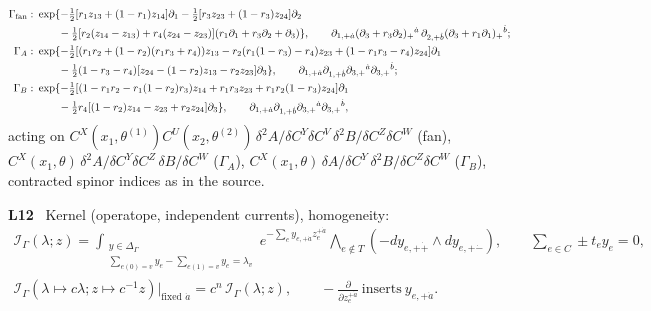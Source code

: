 \documentclass[10pt,a4paper]{article}
\numberwithin{equation}{section}
\newcommand{\cI}{\mathcal I}
\newcommand{\LL}[2]{\textsf{L}(#1){\scriptsize\,\texttt{#2}}}
\newcommand{\LT}[3]{\textsf{L}\,#1\,#2{\scriptsize\,\texttt{#3}}}
\newcommand{\rid}[1]{\par\medskip\noindent\textbf{#1}\ }
\newcommand{\ptr}[2]{\par\nopagebreak{\footnotesize\raggedleft[\,#1\ $\mid$\ #2\,]\par}}
\newcommand{\st}[1]{\textsf{#1}}
\begin{document}
\begin{align*}
\Gamma_{\rm fan}:\ &\exp\{-\tfrac12[r_1z_{13}+(1-r_1)z_{14}]\partial_1-\tfrac12[r_3z_{23}+(1-r_3)z_{24}]\partial_2\\
&\qquad-\tfrac12[r_2(z_{14}-z_{13})+r_4(z_{24}-z_{23})](r_1\partial_1+r_3\partial_2+\partial_3)\},\qquad
\partial_{1,+\dot a}(\partial_3+r_3\partial_2)_+{}^{\dot a}\,\partial_{2,+\dot b}(\partial_3+r_1\partial_1)_+{}^{\dot b};\\
\Gamma_A:\ &\exp\{-\tfrac12[(r_1r_2+(1-r_2)(r_1r_3+r_4))z_{13}-r_2(r_1(1-r_3)-r_4)z_{23}+(1-r_1r_3-r_4)z_{24}]\partial_1\\
&\qquad-\tfrac12(1-r_3-r_4)[z_{24}-(1-r_2)z_{13}-r_2z_{23}]\partial_3\},\qquad\partial_{1,+\dot a}\partial_{1,+\dot b}\partial_{3,+}{}^{\dot a}\partial_{3,+}{}^{\dot b};\\
\Gamma_B:\ &\exp\{-\tfrac12[(1-r_1r_2-r_1(1-r_2)r_3)z_{14}+r_1r_3z_{23}+r_1r_2(1-r_3)z_{24}]\partial_1\\
&\qquad-\tfrac12r_4[(1-r_2)z_{14}-z_{23}+r_2z_{24}]\partial_3\},\qquad\partial_{1,+\dot a}\partial_{1,+\dot b}\partial_{3,+}{}^{\dot a}\partial_{3,+}{}^{\dot b},
\end{align*}
acting on $C^X(x_1,\theta^{(1)})C^U(x_2,\theta^{(2)})\,\delta^2A/\delta C^Y\delta C^V\,\delta^2B/\delta C^Z\delta C^W$ (fan), $C^X(x_1,\theta)\,\delta^2A/\delta C^Y\delta C^Z\,\delta B/\delta C^W$ ($\Gamma_A$), $C^X(x_1,\theta)\,\delta A/\delta C^Y\,\delta^2B/\delta C^Z\delta C^W$ ($\Gamma_B$), contracted spinor indices as in the source.
\ptr{\LL{6.31}{eq-2-34}$=$\LL{2.19}{eq-sum-product1}; \LL{6.2}{eq-2-29}; \LL{6.46}{eq-ring-scalar-associator}; \LL{6.32}{eq-productedges}, \LL{6.33}{eq-product2A}}{\st{P}}

\rid{L12} Kernel (operatope, independent currents), homogeneity:
\begin{gather*}
\cI_\Gamma(\lambda;z)=\int_{\substack{y\in\Delta_\Gamma\\\sum_{e(0)=v}y_e-\sum_{e(1)=v}y_e=\lambda_v}}e^{-\sum_ey_{e,+\dot a}z_e^{+\dot a}}\bigwedge_{e\notin T}(-dy_{e,+\dot+}\wedge dy_{e,+\dot-}),\qquad\sum_{e\in C}\pm t_ey_e=0,\\
\cI_\Gamma(\lambda\mapsto c\lambda;z\mapsto c^{-1}z)\big|_{\text{fixed }\dot a}=c^n\,\cI_\Gamma(\lambda;z),\qquad
-\frac{\partial}{\partial z_e^{+\dot a}}\ \text{inserts}\ y_{e,+\dot a}.
\end{gather*}
\ptr{\LT{Prop.}{3.5}{b-00169} \LL{3.66}{eq-C-current-delta-integral}, \LL{3.77}{eq-operatope}$=$\LL{2.38}{eq-sum-operatope-def}, \LL{2.39}{eq-sum-kirchhoff-laws}; \LL{A.11}{eq-derivative-homogeneity}; Table 2.16 \texttt{tab-sum-dictionary}}{\st{P} (from \textsf{Op}, Wang)}
\end{document}
